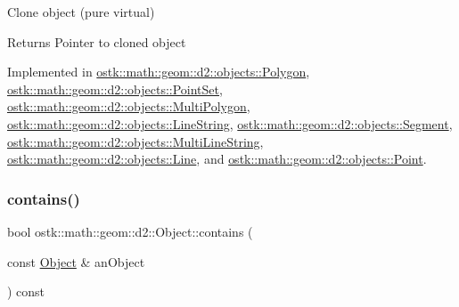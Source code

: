Clone object (pure virtual) 

\begin{DoxyReturn}{Returns}
Pointer to cloned object 
\end{DoxyReturn}


Implemented in \hyperlink{classostk_1_1math_1_1geom_1_1d2_1_1objects_1_1_polygon_a55e4524d1f58bf8379580e63f49f0b48}{ostk\+::math\+::geom\+::d2\+::objects\+::\+Polygon}, \hyperlink{classostk_1_1math_1_1geom_1_1d2_1_1objects_1_1_point_set_ac1d1c3727df0f10f527aa3d3551c8f4e}{ostk\+::math\+::geom\+::d2\+::objects\+::\+Point\+Set}, \hyperlink{classostk_1_1math_1_1geom_1_1d2_1_1objects_1_1_multi_polygon_a89fdf23e9f496c2e5f598c0dc8981c86}{ostk\+::math\+::geom\+::d2\+::objects\+::\+Multi\+Polygon}, \hyperlink{classostk_1_1math_1_1geom_1_1d2_1_1objects_1_1_line_string_abb5ac5e7e3e068c6597aab554e6a5e21}{ostk\+::math\+::geom\+::d2\+::objects\+::\+Line\+String}, \hyperlink{classostk_1_1math_1_1geom_1_1d2_1_1objects_1_1_segment_ad0ba7ee144638335e4f02da0de38beab}{ostk\+::math\+::geom\+::d2\+::objects\+::\+Segment}, \hyperlink{classostk_1_1math_1_1geom_1_1d2_1_1objects_1_1_multi_line_string_abf1b39f7e7f9c1f1ba9b040669863e81}{ostk\+::math\+::geom\+::d2\+::objects\+::\+Multi\+Line\+String}, \hyperlink{classostk_1_1math_1_1geom_1_1d2_1_1objects_1_1_line_a5c81c1f01b0372c7b0f8e597e77dad92}{ostk\+::math\+::geom\+::d2\+::objects\+::\+Line}, and \hyperlink{classostk_1_1math_1_1geom_1_1d2_1_1objects_1_1_point_a8550e9fe2c23c1f38e53093f4480598d}{ostk\+::math\+::geom\+::d2\+::objects\+::\+Point}.

\mbox{\label{classostk_1_1math_1_1geom_1_1d2_1_1_object_ad932da22ca5827ee461b822fffd413c1}} 
\subsubsection{\texorpdfstring{contains()}{contains()}}
{\footnotesize\ttfamily bool ostk\+::math\+::geom\+::d2\+::\+Object\+::contains (\begin{DoxyParamCaption}\item[{const \hyperlink{classostk_1_1math_1_1geom_1_1d2_1_1_object}{Object} \&}]{an\+Object }\end{DoxyParamCaption}) const\hspace{0.3cm}{\ttfamily [virtual]}}



